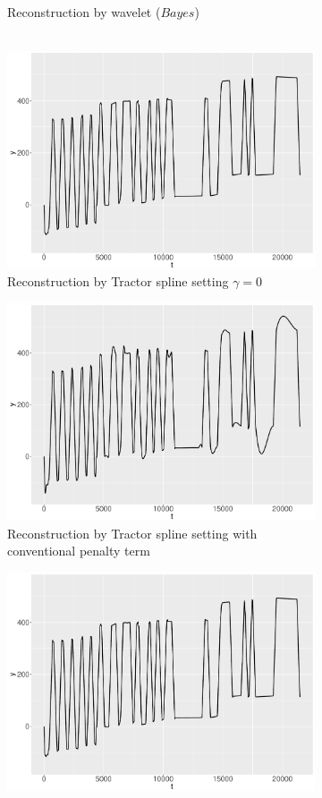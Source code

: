 \begin{figure}
\begin{subfigure}{0.45\textwidth}
    \caption{Reconstruction by wavelet ($\textit{Bayes}$)\\ \mbox{  }}
    \end{subfigure}
    \begin{subfigure}{0.45\textwidth}
    \centering
    \includegraphics[width=\linewidth,height=0.5\textwidth]{Chapters/02TractorSplineTheory/plot/ggplot/ggRealdataYTractorGamma.pdf}
    \caption{Reconstruction by Tractor spline setting  $\gamma=0$ }
    \end{subfigure}
    \begin{subfigure}{0.45\textwidth}
    \centering
    \includegraphics[width=\linewidth,height=0.5\textwidth]{Chapters/02TractorSplineTheory/plot/ggplot/ggRealdataYTractorAPT.pdf}
    \caption{Reconstruction by Tractor spline setting with conventional penalty term}
    \end{subfigure}
    \begin{subfigure}{0.45\textwidth}
    \centering
    \includegraphics[width=\linewidth,height=0.5\textwidth]{Chapters/02TractorSplineTheory/plot/ggplot/ggRealdataYTractor.pdf}

\end{subfigure}
\end{figure}
